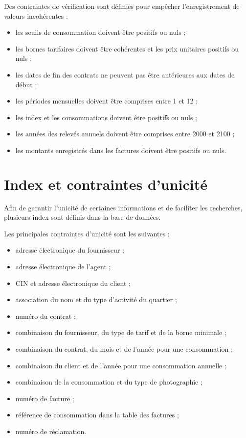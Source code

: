 Des contraintes de vérification sont définies pour empêcher l'enregistrement de valeurs incohérentes :

\begin{itemize}[leftmargin=*]
    \item les seuils de consommation doivent être positifs ou nuls ;
    \item les bornes tarifaires doivent être cohérentes et les prix unitaires positifs ou nuls ;
    \item les dates de fin des contrats ne peuvent pas être antérieures aux dates de début ;
    \item les périodes mensuelles doivent être comprises entre 1 et 12 ;
    \item les index et les consommations doivent être positifs ou nuls ;
    \item les années des relevés annuels doivent être comprises entre 2000 et 2100 ;
    \item les montants enregistrés dans les factures doivent être positifs ou nuls.
\end{itemize}

\section{Index et contraintes d'unicité}

Afin de garantir l'unicité de certaines informations et de faciliter les recherches, plusieurs index sont définis dans la base de données.

Les principales contraintes d'unicité sont les suivantes :

\begin{itemize}[leftmargin=*]
    \item adresse électronique du fournisseur ;
    \item adresse électronique de l'agent ;
    \item CIN et adresse électronique du client ;
    \item association du nom et du type d'activité du quartier ;
    \item numéro du contrat ;
    \item combinaison du fournisseur, du type de tarif et de la borne minimale ;
    \item combinaison du contrat, du mois et de l'année pour une consommation ;
    \item combinaison du client et de l'année pour une consommation annuelle ;
    \item combinaison de la consommation et du type de photographie ;
    \item numéro de facture ;
    \item référence de consommation dans la table des factures ;
    \item numéro de réclamation.
\end{itemize}


